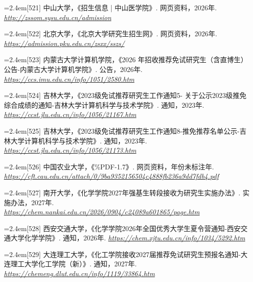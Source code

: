 {\par\noindent\hangindent=2.4em\label{src:S0068}{\color{cAccent}[521]} 中山大学，《招生信息 | 中山医学院》. 网页资料，2026年. \textit{\url{http://zssom.sysu.edu.cn/admission}}\par
\par\noindent\hangindent=2.4em\label{src:S0071}{\color{cAccent}[522]} 北京大学，《北京大学研究生招生网》. 网页资料，2026年. \textit{\url{https://admission.pku.edu.cn/zsxx/sszs/}}\par
\par\noindent\hangindent=2.4em\label{src:S0082}{\color{cAccent}[523]} 内蒙古大学计算机学院，《2026 年招收推荐免试研究生（含直博生）公告-内蒙古大学计算机学院》. 公告，2026年. \textit{\url{https://ccs.imu.edu.cn/info/1051/2580.htm}}\par
\par\noindent\hangindent=2.4em\label{src:S0084}{\color{cAccent}[524]} 吉林大学，《2023级免试推荐研究生工作通知5- 关于公示2023级推免综合成绩的通知-吉林大学计算机科学与技术学院》. 通知，2023年. \textit{\url{https://ccst.jlu.edu.cn/info/1056/21167.htm}}\par
\par\noindent\hangindent=2.4em\label{src:S0085}{\color{cAccent}[525]} 吉林大学，《2023级免试推荐研究生工作通知8-推免推荐名单公示-吉林大学计算机科学与技术学院》. 通知，2023年. \textit{\url{https://ccst.jlu.edu.cn/info/1056/21173.htm}}\par
\par\noindent\hangindent=2.4em\label{src:S0089}{\color{cAccent}[526]} 中国农业大学，《\%PDF-1.7》. 网页资料，年份未标注年. \textit{\url{https://cft.cau.edu.cn/attach/0/9ba9352156504c4888fb236a9dd7fdb4.pdf}}\par
\par\noindent\hangindent=2.4em\label{src:S0090}{\color{cAccent}[527]} 南开大学，《化学学院2027年强基生转段接收为研究生实施办法》. 实施办法，2027年. \textit{\url{https://chem.nankai.edu.cn/2026/0904/c24089a601865/page.htm}}\par
\par\noindent\hangindent=2.4em\label{src:S0092}{\color{cAccent}[528]} 西安交通大学，《化学学院2026年全国优秀大学生夏令营通知-西安交通大学化学学院》. 通知，2026年. \textit{\url{https://chem.xjtu.edu.cn/info/1034/5292.htm}}\par
\par\noindent\hangindent=2.4em\label{src:S0093}{\color{cAccent}[529]} 大连理工大学，《化工学院接收2027届推荐免试研究生预报名通知-大连理工大学化工学院（新）》. 通知，2027年. \textit{\url{https://chemeng.dlut.edu.cn/info/1119/33864.htm}}\par
}
